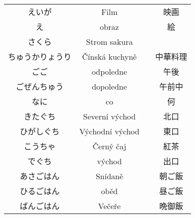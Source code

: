 \begin{table}[H]
\begin{tabular}{cccc}
えいが      & Film              & & 映画         \\
え        & obraz               && 絵        \\
さくら      & Strom sakura      & &          \\
ちゅうかりょうり & Čínská kuchyně&     & 中華料理    \\
ごご       & odpoledne           && 午後        \\
ごぜんちゅう   & dopoledne       &   & 午前中       \\
なに       & co                  && 何      \\
きたぐち     & Severní východ    & & 北口      \\
ひがしぐち    & Východní východ  &  & 東口      \\
こうちゃ     & Černý čaj         & & 紅茶      \\
でぐち      & východ             && 出口     \\
あさごはん    & Snídaně          &  & 朝ご飯     \\
ひるごはん    & oběd             &  & 昼ご飯     \\
ばんごはん    & Večeře           &  & 晩御飯    \\
\hline
\end{tabular}
\end{table}